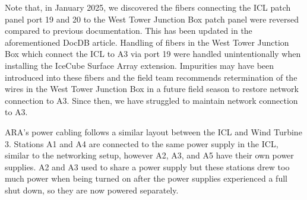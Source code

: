         Note that, in January 2025, we discovered the fibers connecting the ICL patch panel port 19 and 20 to the West Tower Junction Box patch panel were reversed compared to previous documentation.
        This has been updated in the aforementioned DocDB article. 
        Handling of fibers in the West Tower Junction Box which connect the ICL to A3 via port 19 were handled unintentionally when installing the IceCube Surface Array extension. 
        Impurities may have been introduced into these fibers and the field team recommends retermination of the wires in the West Tower Junction Box in a future field season to restore network connection to A3.
        Since then, we have struggled to maintain network connection to A3. %


        ARA's power cabling follows a similar layout between the ICL and Wind Turbine 3. 
        Stations A1 and A4 are connected to the same power supply in the ICL, similar to the networking setup, however A2, A3, and A5 have their own power supplies. 
        A2 and A3 used to share a power supply but these stations drew too much power when being turned on after the power supplies experienced a full shut down, so they are now powered separately.

